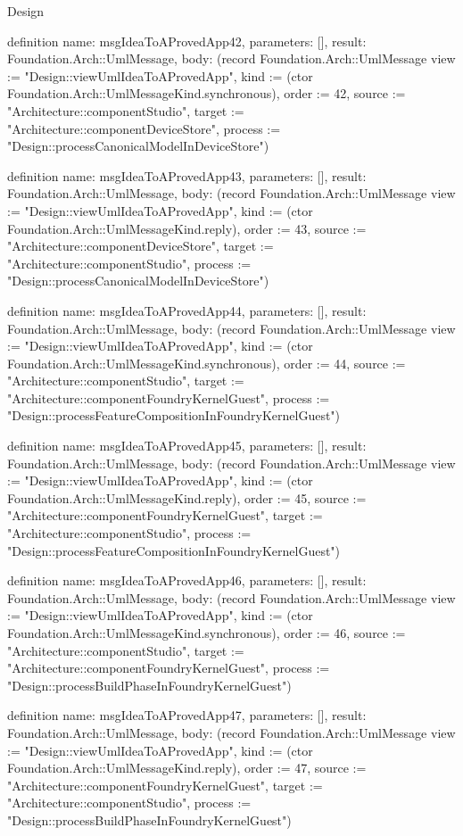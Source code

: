 \begin{lexlean}{Design}
\begin{semanticmodule}
definition{
  name: msgIdeaToAProvedApp42,
  parameters: [],
  result: Foundation.Arch::UmlMessage,
  body: (record Foundation.Arch::UmlMessage {view := "Design::viewUmlIdeaToAProvedApp", kind := (ctor Foundation.Arch::UmlMessageKind.synchronous), order := 42, source := "Architecture::componentStudio", target := "Architecture::componentDeviceStore", process := "Design::processCanonicalModelInDeviceStore"})
}

definition{
  name: msgIdeaToAProvedApp43,
  parameters: [],
  result: Foundation.Arch::UmlMessage,
  body: (record Foundation.Arch::UmlMessage {view := "Design::viewUmlIdeaToAProvedApp", kind := (ctor Foundation.Arch::UmlMessageKind.reply), order := 43, source := "Architecture::componentDeviceStore", target := "Architecture::componentStudio", process := "Design::processCanonicalModelInDeviceStore"})
}

definition{
  name: msgIdeaToAProvedApp44,
  parameters: [],
  result: Foundation.Arch::UmlMessage,
  body: (record Foundation.Arch::UmlMessage {view := "Design::viewUmlIdeaToAProvedApp", kind := (ctor Foundation.Arch::UmlMessageKind.synchronous), order := 44, source := "Architecture::componentStudio", target := "Architecture::componentFoundryKernelGuest", process := "Design::processFeatureCompositionInFoundryKernelGuest"})
}

definition{
  name: msgIdeaToAProvedApp45,
  parameters: [],
  result: Foundation.Arch::UmlMessage,
  body: (record Foundation.Arch::UmlMessage {view := "Design::viewUmlIdeaToAProvedApp", kind := (ctor Foundation.Arch::UmlMessageKind.reply), order := 45, source := "Architecture::componentFoundryKernelGuest", target := "Architecture::componentStudio", process := "Design::processFeatureCompositionInFoundryKernelGuest"})
}

definition{
  name: msgIdeaToAProvedApp46,
  parameters: [],
  result: Foundation.Arch::UmlMessage,
  body: (record Foundation.Arch::UmlMessage {view := "Design::viewUmlIdeaToAProvedApp", kind := (ctor Foundation.Arch::UmlMessageKind.synchronous), order := 46, source := "Architecture::componentStudio", target := "Architecture::componentFoundryKernelGuest", process := "Design::processBuildPhaseInFoundryKernelGuest"})
}

definition{
  name: msgIdeaToAProvedApp47,
  parameters: [],
  result: Foundation.Arch::UmlMessage,
  body: (record Foundation.Arch::UmlMessage {view := "Design::viewUmlIdeaToAProvedApp", kind := (ctor Foundation.Arch::UmlMessageKind.reply), order := 47, source := "Architecture::componentFoundryKernelGuest", target := "Architecture::componentStudio", process := "Design::processBuildPhaseInFoundryKernelGuest"})
}


\end{semanticmodule}
\end{lexlean}
